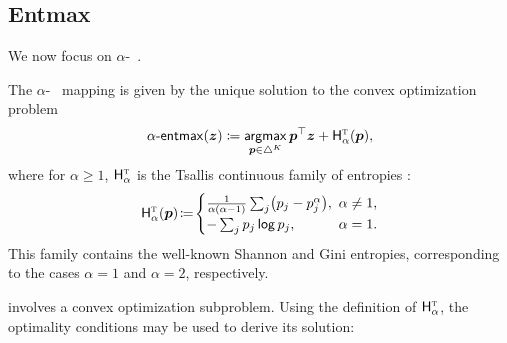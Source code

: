 \subsection{Entmax}\label{sec:entmax_bg}

We now focus on $\alpha$-\entmaxtext~\citep{blondel2019learning,entmax}.

\newpage

\begin{definition}[$\aentmax$]
    The $\alpha$-\entmaxtext~\citep{blondel2019learning,entmax} mapping
    is given by the unique solution to the convex optimization problem
    \begin{equation}\label{eq:define_entmax}
        \mathop{\mathsf{\alpha}\textnormal{-}\mathsf{entmax}}(\bm{z}) \coloneqq
        \operatorname*{\mathsf{argmax}}_{\bm{p} \in \triangle^K} \bm{p}^\top\bm{z} + \mathsf{H}^{{\textsc{t}}}_{\alpha}(\bm{p}),
    \end{equation}
    where for $\alpha\geq1$,
    $\mathsf{H}^{{\textsc{t}}}_\alpha$ is the Tsallis continuous family of entropies
    \citep{Tsallis1988}:
    \begin{equation}\label{eq:tsallisdef}
        \HHt_{\alpha}(\bm{p})\!\coloneqq\!
        \begin{cases}
            \frac{1}{\alpha(\alpha-1)}\sum_j\!\left(p_j - p_j^\alpha\right)\!, &
            \!\!\!\alpha \ne 1,                                                  \\
            -\sum_j \pp_j \log \pp_j,                                          &
            \!\!\!\alpha = 1.
        \end{cases}
    \end{equation}
    This family contains the well-known Shannon and Gini entropies,
    corresponding to the cases $\alpha=1$ and $\alpha=2$, respectively.
\end{definition}

 involves a convex optimization subproblem. Using the
definition of $\mathsf{H}^{{\textsc{t}}}_\alpha$, the optimality conditions may be used to derive its solution:


